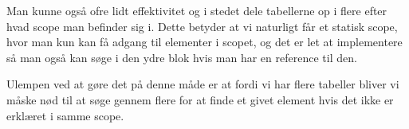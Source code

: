 \noindent Man kunne også ofre lidt effektivitet og i stedet dele tabellerne op i flere efter hvad scope man befinder sig i. Dette betyder at vi naturligt får et statisk scope, hvor man kun kan få adgang til elementer i scopet, og det er let at implementere så man også kan søge i den ydre blok hvis man har en reference til den.
    
    
    
\noindent Ulempen ved at gøre det på denne måde er at fordi vi har flere tabeller bliver vi måske nød til at søge gennem flere for at finde et givet element hvis det ikke er erklæret i samme scope. 
    
